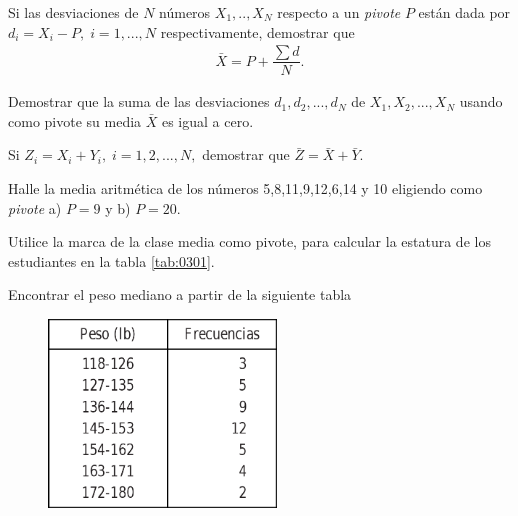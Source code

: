 \begin{problema}
	\label{problema:3.18}
	Si las desviaciones de $N$ números $X_{1},..,X_{N}$ respecto a un \emph{pivote} $P$ están dada por $d_{i}=X_{i}-P, \; i=1,...,N$ respectivamente, demostrar que
	\begin{align}
		\bar{X}=P+\dfrac{\sum d}{N}.
	\end{align}
\end{problema}



\begin{problema}
	\label{problema:3.16}
	Demostrar que la suma de las desviaciones $d_{1},d_{2},...,d_{N}$ de $X_{1},X_{2},...,X_{N}$ usando como pivote su media $\bar{X}$ es igual a cero.
\end{problema}



\begin{problema}
	\label{problema:3.17}
	Si $Z_{i}=X_{i}+Y_{i}, \; i=1,2,...,N,$ demostrar que $\bar{Z}=\bar{X}+\bar{Y}.$
\end{problema}




\begin{problema}
	\label{problema:3.19}
	Halle la media aritmética de los números 5,8,11,9,12,6,14 y 10 eligiendo como \emph{pivote} a) $P=9$ y b) $P=20.$
\end{problema}




\begin{problema}
	\label{problema:3.20}
	Utilice la marca de la clase media como pivote, para calcular la estatura de los estudiantes en la tabla \ref{tab:0301}.
\end{problema}



\begin{problema}
	\label{problema:3.28}
	Encontrar el peso mediano a partir de la siguiente tabla
	\begin{figure}[ht]
		\centering
		\includegraphics[height=5cm,keepaspectratio=true]{./images/tab0307.png}
		\label{tab:0307}
	\end{figure}
	
\end{problema}

